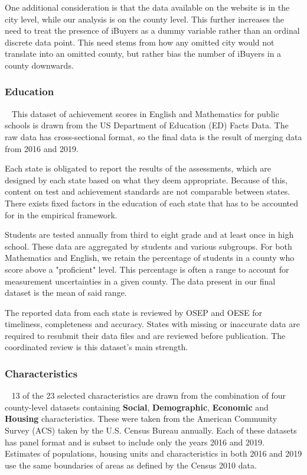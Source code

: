 One additional consideration is that the data available on the website is in the city level, while our analysis is on the county level. This further increases the need to treat the presence of iBuyers as a dummy variable rather than an ordinal discrete data point. This need stems from how any omitted city would not translate into an omitted county, but rather bias the number of iBuyers in a county downwards.

\subsubsection{Education} 
This dataset of achievement scores in English and Mathematics for public schools is drawn from the US Department of Education (ED) Facts Data. The raw data has cross-sectional format, so the final data is the result of merging data from 2016 and 2019.  

Each state is obligated to report the results of the assessments, which are designed by each state based on what they deem appropriate. Because of this, content on test and achievement standards are not comparable between states. There exists fixed factors in the education of each state that has to be accounted for in the empirical framework.  

Students are tested annually from third to eight grade and at least once in high school. These data are aggregated by students and various subgroups. For both Mathematics and English, we retain the percentage of students in a county who score above a "proficient" level. This percentage is often a range to account for measurement uncertainties in a given county. The data present in our final dataset is the mean of said range. 

The reported data from each state is reviewed by OSEP and OESE for timeliness, completeness and accuracy. States with missing or inaccurate data are required to resubmit their data files and are reviewed before publication. The coordinated review is this dataset’s main strength. 


\subsubsection{Characteristics} 
13 of the 23 selected characteristics are drawn from the combination of four county-level datasets containing \textbf{Social}, \textbf{Demographic}, \textbf{Economic} and \textbf{Housing} characteristics. These were taken from the American Community Survey (ACS) taken by the U.S. Census Bureau annually. Each of these datasets has panel format and is subset to include only the years 2016 and 2019.  Estimates of populations, housing units and characteristics in both 2016 and 2019 use the same boundaries of areas as defined by the Census 2010 data.  

